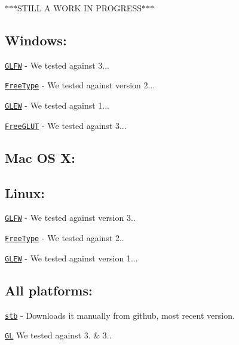 $\ast$$\ast$$\ast$\+S\+T\+I\+L\+L A W\+O\+R\+K I\+N P\+R\+O\+G\+R\+E\+S\+S$\ast$$\ast$$\ast$

\subsection*{Windows\+:}

\href{https://github.com/glfw/glfw/releases/download/3.1.1/glfw-3.1.1.zip}{\tt G\+L\+F\+W} -\/ We tested against 3...

\href{http://downloads.sourceforge.net/project/gnuwin32/freetype/2.3.5-1/freetype-2.3.5-1-bin.zip}{\tt Free\+Type} -\/ We tested against version 2...

\href{http://downloads.sourceforge.net/project/glew/glew/1.12.0/glew-1.12.0.zip}{\tt G\+L\+E\+W} -\/ We tested against 1...

\href{http://downloads.sourceforge.net/project/freeglut/freeglut/3.0.0/freeglut-3.0.0.tar.gz}{\tt Free\+G\+L\+U\+T} -\/ We tested against 3... \subsection*{Mac O\+S X\+:}

\subsection*{Linux\+:}

\href{http://www.glfw.org/download.html}{\tt G\+L\+F\+W} -\/ We tested against version 3..

\href{http://www.freetype.org/download.html}{\tt Free\+Type} -\/ We tested against 2..

\href{http://glew.sourceforge.net/}{\tt G\+L\+E\+W} -\/ We tested against version 1...

\subsection*{All platforms\+:}

\href{https://github.com/nothings/stb/archive/master.zip}{\tt stb} -\/ Downloads it manually from github, most recent version.

\href{https://www.opengl.org/}{\tt G\+L} We tested against 3. \& 3.. 
